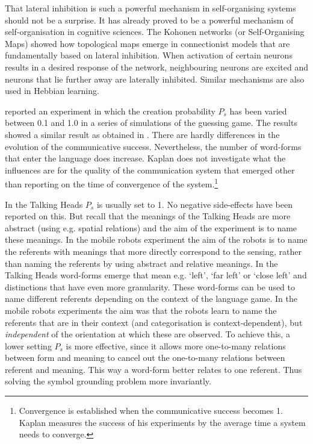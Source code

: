 That lateral inhibition is such a powerful mechanism in self-organising systems should not be a surprise. It has already proved to be a powerful mechanism of self-organisation in cognitive sciences. The Kohonen networks (or Self-Organising Maps) showed how topological maps emerge in connectionist models that are fundamentally based on lateral inhibition. When activation of certain neurons results in a desired response of the network, neighbouring neurons are excited and neurons that lie further away are laterally inhibited. Similar mechanisms are also used in Hebbian learning.


\citet{kaplan:2000} reported an experiment in which the creation probability $P_s$ has been varied between 0.1 and 1.0 in a series of simulations of the guessing game. The results showed a similar result as obtained in . There are hardly differences in the evolution of the communicative success. Nevertheless, the number of word-forms that enter the language does increase. Kaplan does not investigate what the influences are for the quality of the communication system that emerged other than reporting on the time of convergence of the system.\footnote{Convergence is established when the communicative success becomes 1. Kaplan measures the success of his experiments by the average time a system needs to converge.}

In the Talking Heads $P_s$ is usually set to 1. No negative side-effects have been reported on this. But recall that the meanings of the Talking Heads are more abstract (using e.g. spatial relations) and the aim of the experiment is to name these meanings. In the mobile robots experiment the aim of the robots is to name the referents with meanings that more directly correspond to the sensing, rather than naming the referents by using abstract and relative meanings. In the Talking Heads word-forms emerge that mean e.g. `left', `far left' or `close left' and distinctions that have even more granularity. These word-forms can be used to name different referents depending on the context of the language game. In the mobile robots experiments the aim was that the robots learn to name the referents that are in their context (and categorisation is context-dependent), but {\em independent} of the orientation at which these are observed. To achieve this, a lower setting $P_s$ is more effective, since it allows more one-to-many relations between form and meaning to cancel out the one-to-many relations between referent and meaning. This way a word-form better relates to one referent. Thus solving the symbol grounding problem more invariantly.


